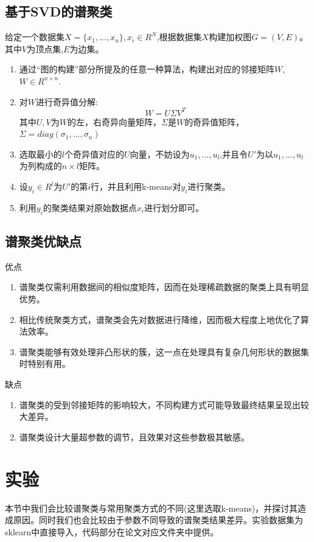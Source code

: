 \documentclass[11pt]{scrartcl}
\begin{document}
\subsection{基于SVD的谱聚类}
给定一个数据集$X=\{x_1,...,x_n\},x_i\in R^N$,根据数据集$X$构建加权图$G=(V,E)$。其中$V$为顶点集,$E$为边集。
\begin{enumerate}[(i.)]
\item 通过“图的构建”部分所提及的任意一种算法，构建出对应的邻接矩阵$W$,$W\in R^{n\times n}$.
\item 对$W$进行奇异值分解:
$$
W=U\Sigma V^T
$$
其中$U,V$为$W$的左，右奇异向量矩阵，$\Sigma$是$W$的奇异值矩阵，$\Sigma=diag(\sigma_1,...,\sigma_n)$
\item 选取最小的$l$个奇异值对应的$U$向量，不妨设为$u_1,...,u_l$,并且令$U'$为以$u_1,...,u_l$为列构成的$n\times l$矩阵。
\item 设$y_i\in R^l$为$U'$的第$i$行，并且利用k-means对$y_i$进行聚类。
\item 利用$y_i$的聚类结果对原始数据点$x_i$进行划分即可。



\end{enumerate}


\subsection{谱聚类优缺点}
\noindent

优点
\begin{enumerate}
\item 谱聚类仅需利用数据间的相似度矩阵，因而在处理稀疏数据的聚类上具有明显优势。
\item 相比传统聚类方式，谱聚类会先对数据进行降维，因而极大程度上地优化了算法效率。
\item 谱聚类能够有效处理非凸形状的簇，这一点在处理具有复杂几何形状的数据集时特别有用。

\end{enumerate}


缺点
\begin{enumerate}
\item 谱聚类的受到邻接矩阵的影响较大，不同构建方式可能导致最终结果呈现出较大差异。
\item 谱聚类设计大量超参数的调节，且效果对这些参数极其敏感。

\end{enumerate}


\section{实验}
本节中我们会比较谱聚类与常用聚类方式的不同(这里选取k-means)，并探讨其造成原因。同时我们也会比较由于参数不同导致的谱聚类结果差异。实验数据集为sklearn中直接导入，代码部分在论文对应文件夹中提供。
\end{document}
